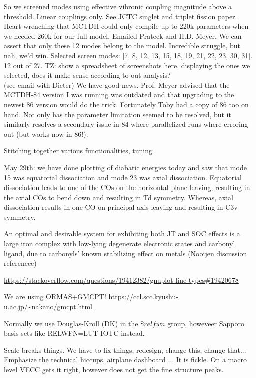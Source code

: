    So we screened modes using effective vibronic coupling magnitude above a threshold. Linear couplings only. See JCTC singlet and triplet fission paper. Heart-wrenching that MCTDH could only compile up to 220k parameters when we needed 260k for our full model. Emailed Prateek and H.D.-Meyer. We can assert that only these 12 modes belong to the model. Incredible struggle, but nah, we'd win. Selected screen modes: [7, 8, 12, 13, 15, 18, 19, 21, 22, 23, 30, 31]. 12 out of 27. TZ: show a spreadsheet of screenshots here, displaying the ones we selected, does it make sense according to out analysis? \\

    (see email with Dieter) We have good news. Prof. Meyer advised that the MCTDH-84 version I was running was outdated and that upgrading to the newest 86 version would do the trick. Fortunately Toby had a copy of 86 too on hand. Not only has the parameter limitation seemed to be resolved, but it similarly resolves a secondary issue in 84 where parallelized runs where erroring out (but works now in 86!).

    Stitching together various functionalities, tuning

    May 29th: we have done plotting of diabatic energies today and saw that mode 15 was equatorial dissociation and mode 23 was axial dissociation. Equatorial dissociation leads to one of the COs on the horizontal plane leaving, resulting in the axial COs to bend down and resulting in Td symmetry. Whereas, axial dissociation results in one CO on principal axis leaving and resulting in C3v symmetry.

    An optimal and desirable system for exhibiting both JT and SOC effects is a large iron complex with low-lying degenerate electronic states and carbonyl ligand, due to carbonyls' known stabilizing effect on metals (Nooijen discussion referenece)

    \url{https://stackoverflow.com/questions/19412382/gnuplot-line-types#19420678}

    We are using ORMAS+GMCPT!
    \url{https://ccl.scc.kyushu-u.ac.jp/~nakano/gmcpt.html}

    Normally we use Douglas-Kroll (DK) in the $\$relfwn$ group, howeveer Sapporo basis sets like RELWFN=LUT-IOTC instead.
    
    Scale breaks things. We have to fix things, redesign, change this, change that... \\
    Emphasize the technical hiccups, airplane dashboard ... It is fickle. On a macro level VECC gets it right, however does not get the fine structure peaks. 


